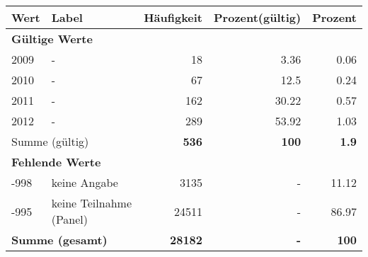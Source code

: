      \begin{longtable}{lXrrr}
     \toprule
     \textbf{Wert} & \textbf{Label} & \textbf{Häufigkeit} & \textbf{Prozent(gültig)} & \textbf{Prozent} \\
     \endhead
     \midrule
     \multicolumn{5}{l}{\textbf{Gültige Werte}}\\

     2009 &
     \multicolumn{1}{X}{ -  } &


       \num{18} &
       \num[round-mode=places,round-precision=2]{3.36} &
         \num[round-mode=places,round-precision=2]{0.06} \\

     2010 &
     \multicolumn{1}{X}{ -  } &


       \num{67} &
       \num[round-mode=places,round-precision=2]{12.5} &
         \num[round-mode=places,round-precision=2]{0.24} \\

     2011 &
     \multicolumn{1}{X}{ -  } &


       \num{162} &
       \num[round-mode=places,round-precision=2]{30.22} &
         \num[round-mode=places,round-precision=2]{0.57} \\

     2012 &
     \multicolumn{1}{X}{ -  } &


       \num{289} &
       \num[round-mode=places,round-precision=2]{53.92} &
         \num[round-mode=places,round-precision=2]{1.03} \\
     \midrule
     \multicolumn{2}{l}{Summe (gültig)} &
       \textbf{\num{536}} &
     \textbf{\num{100}} &
       \textbf{\num[round-mode=places,round-precision=2]{1.9}} \\
     \multicolumn{5}{l}{\textbf{Fehlende Werte}}\\
       -998 &
       keine Angabe &
         \num{3135} &
        - &
         \num[round-mode=places,round-precision=2]{11.12} \\
       -995 &
       keine Teilnahme (Panel) &
         \num{24511} &
        - &
         \num[round-mode=places,round-precision=2]{86.97} \\
     \midrule
     \multicolumn{2}{l}{\textbf{Summe (gesamt)}} &
          \textbf{\num{28182}} &
        \textbf{-} &
        \textbf{\num{100}} \\
     \bottomrule
     \end{longtable}
     
